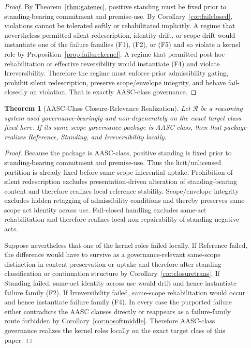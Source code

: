 \documentclass[11pt]{article}
\newtheorem{theorem}{Theorem}[section]
\begin{document}
\begin{proof}
By Theorem~\ref{thm:gatenec}, positive standing must be fixed prior to standing-bearing commitment and premise-use. By Corollary~\ref{cor:failclosed}, violations cannot be tolerated softly or rehabilitated implicitly. A regime that nevertheless permitted silent redescription, identity drift, or scope drift would instantiate one of the failure families \textup{(F1)}, \textup{(F2)}, or \textup{(F5)} and so violate a kernel role by Proposition~\ref{prop:failurekernel}. A regime that permitted post-hoc rehabilitation or effective reversibility would instantiate \textup{(F4)} and violate Irreversibility. Therefore the regime must enforce prior admissibility gating, prohibit silent redescription, preserve scope/envelope integrity, and behave fail-closedly on violation. That is exactly AASC-class governance.
\end{proof}

\begin{theorem}[AASC-Class Closure-Relevance Realization]
\label{thm:aascrealization}
Let $\mathcal{R}$ be a reasoning system used governance-bearingly and non-degenerately on the exact target class fixed here. If its same-scope governance package is AASC-class, then that package realizes Reference, Standing, and Irreversibility locally.
\end{theorem}

\begin{proof}
Because the package is AASC-class, positive standing is fixed prior to standing-bearing commitment and premise-use. Thus the licit/unlicensed partition is already fixed before same-scope inferential uptake. Prohibition of silent redescription excludes presentation-driven alteration of standing-bearing content and therefore realizes local reference stability. Scope/envelope integrity excludes hidden retagging of admissibility conditions and thereby preserves same-scope act identity across use. Fail-closed handling excludes same-act rehabilitation and therefore realizes local non-repairability of standing-negative acts.

Suppose nevertheless that one of the kernel roles failed locally. If Reference failed, the difference would have to survive as a governance-relevant same-scope distinction in content-preservation or uptake and therefore alter standing classification or continuation structure by Corollary~\ref{cor:closuretrans}. If Standing failed, same-act identity across use would drift and hence instantiate failure family \textup{(F2)}. If Irreversibility failed, same-scope rehabilitation would occur and hence instantiate failure family \textup{(F4)}. In every case the purported failure either contradicts the AASC clauses directly or reappears as a failure-family route forbidden by Corollary~\ref{cor:nosoftmiddle}. Therefore AASC-class governance realizes the kernel roles locally on the exact target class of this paper.
\end{proof}
\end{document}
